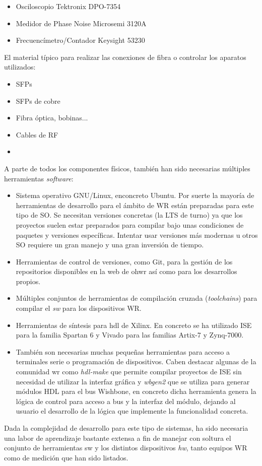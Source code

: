 \begin{itemize}
	\item Osciloscopio Tektronix DPO-7354 
	\item Medidor de Phase Noise Microsemi 3120A 
	\item Frecuencímetro/Contador Keysight 53230 
\end{itemize}

El material típico para realizar las conexiones de fibra o controlar los 
aparatos utilizados:

\begin{itemize}
	\item SFPs 
	\item SFPs de cobre
	\item Fibra óptica, bobinas...
	\item Cables de RF 
	\item {}
\end{itemize}

A parte de todos los componentes físicos, también han sido necesarias múltiples 
herramientas \textit{software}:

\begin{itemize}
	\item Sistema operativo GNU/Linux, enconcreto Ubuntu. Por suerte la mayoría 
	de herramientas de desarrollo para el ámbito de WR están preparadas para 
	este tipo de SO. Se necesitan versiones concretas (la LTS de turno) ya que 
	los proyectos suelen estar preparados para compilar bajo unas condiciones 
	de paquetes y versiones específicas. Intentar usar versiones más modernas u 
	otros SO requiere un gran manejo y una gran inversión de tiempo.
	
	\item Herramientas de control de versiones, como Git, para la gestión de 
	los repositorios disponibles en la web de \gls{ohwr} \cite{website:ohwr} 
	así como para los desarrollos propios.
	
	\item Múltiples conjuntos de herramientas de compilación cruzada 
	(\textit{toolchains}) para compilar el \textit{sw} para los dispositivos WR.
	
	\item Herramientas de síntesis para \gls{hdl} de Xilinx. En concreto se ha 
	utilizado ISE para la familia Spartan 6 y Vivado para las familias Artix-7 
	y Zynq-7000.
	
	\item También son necesarias muchas pequeñas herramientas para acceso a 
	terminales serie o programación de dispositivos. Caben destacar algunas de 
	la comunidad \gls{wr} como \textit{hdl-make} que permite compilar proyectos 
	de ISE sin necesidad de utilizar la interfaz gráfica y \textit{wbgen2} que 
	se utiliza para generar módulos HDL para el bus Wishbone, en concreto dicha 
	herramienta genera 
	la lógica de control para acceso a bus y la interfaz del módulo, dejando al 
	usuario el desarrollo de la lógica que implemente la funcionalidad concreta.
\end{itemize}

Dada la complejidad de desarrollo para este tipo de sistemas, ha sido necesaria 
una labor de aprendizaje bastante extensa a fin de manejar con soltura el 
conjunto de herramientas sw y los distintos dispositivos \textit{hw}, tanto 
equipos WR como de medición que han sido listados.